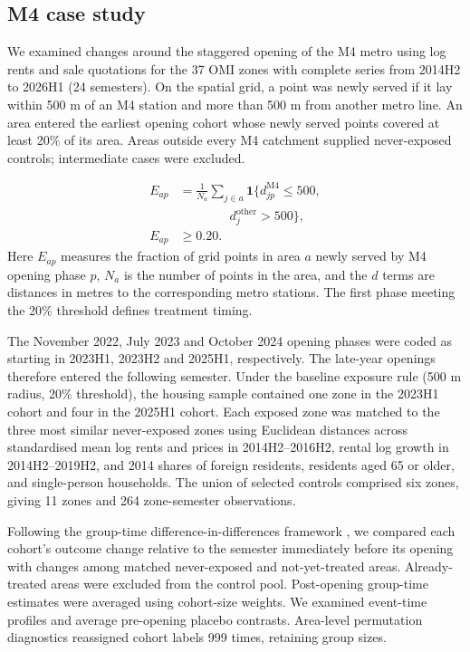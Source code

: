 \subsection*{M4 case study}
We examined changes around the staggered opening of the M4 metro using log rents and sale quotations for the 37 OMI zones with complete series from 2014H2 to 2026H1 (24 semesters). On the spatial grid, a point was newly served if it lay within 500 m of an M4 station and more than 500 m from another metro line. An area entered the earliest opening cohort whose newly served points covered at least 20\% of its area. Areas outside every M4 catchment supplied never-exposed controls; intermediate cases were excluded.

\begin{equation}
\begin{aligned}
E_{ap}&=\frac{1}{N_a}\sum_{j\in a}\mathbf{1}\bigl\{
 d^{\mathrm{M4}}_{jp}\leq 500,\\
&\qquad\qquad d^{\mathrm{other}}_j>500\bigr\},\\
E_{ap}&\geq 0.20.
\end{aligned}
\label{eq:m4_exposure}
\end{equation}
Here $E_{ap}$ measures the fraction of grid points in area $a$ newly served by M4 opening phase $p$, $N_a$ is the number of points in the area, and the $d$ terms are distances in metres to the corresponding metro stations. The first phase meeting the 20\% threshold defines treatment timing.

The November 2022, July 2023 and October 2024 opening phases \cite{milano_m4} were coded as starting in 2023H1, 2023H2 and 2025H1, respectively. The late-year openings therefore entered the following semester. Under the baseline exposure rule (500 m radius, 20\% threshold), the housing sample contained one zone in the 2023H1 cohort and four in the 2025H1 cohort. Each exposed zone was matched to the three most similar never-exposed zones using Euclidean distances across standardised mean log rents and prices in 2014H2--2016H2, rental log growth in 2014H2--2019H2, and 2014 shares of foreign residents, residents aged 65 or older, and single-person households. The union of selected controls comprised six zones, giving 11 zones and 264 zone-semester observations.

Following the group-time difference-in-differences framework \cite{callaway_santanna}, we compared each cohort's outcome change relative to the semester immediately before its opening with changes among matched never-exposed and not-yet-treated areas. Already-treated areas were excluded from the control pool. Post-opening group-time estimates were averaged using cohort-size weights. We examined event-time profiles and average pre-opening placebo contrasts. Area-level permutation diagnostics reassigned cohort labels 999 times, retaining group sizes.

